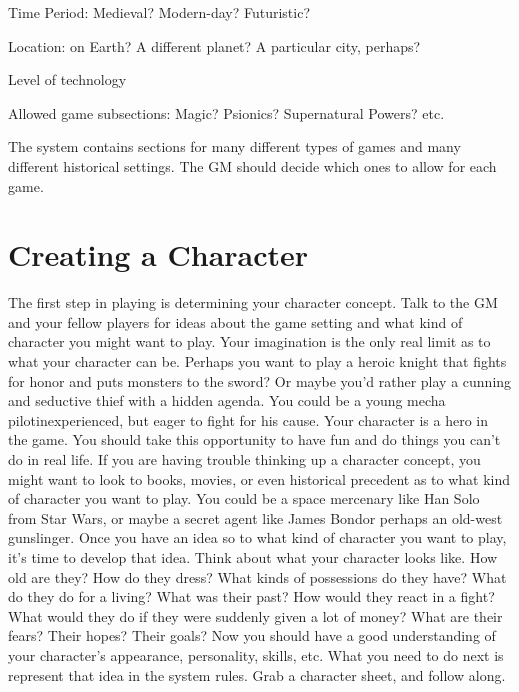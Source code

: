 \documentclass[twoside]{book}
\begin{document}
                 Time Period: Medieval? Modern-day? Futuristic?
                 
              
              
                  Location: on Earth? A different planet? A
                 particular city, perhaps? 
              
              
                Level of technology   
              
              
                  Allowed game subsections: Magic? Psionics?
                 Supernatural Powers? etc. 
              
           The \APATHY{}  system contains sections for many
            different types of games and many different historical
            settings. The GM should decide which ones to allow for each
            game.
          
\section{Creating a Character}
     The first step in playing \APATHY{}  is determining
            your character concept. Talk to the GM and your fellow
            players for ideas about the game setting and what kind of
            character you might want to play. Your imagination is the
            only real limit as to what your character can be. Perhaps you
            want to play a heroic knight that fights for honor and puts
            monsters to the sword? Or maybe you'd rather play a
            cunning and seductive thief with a hidden agenda. You could
            be a young mecha pilotinexperienced, but eager to
            fight for his cause. Your character is a hero in the game.
            You should take this opportunity to have fun and do things
            you can't do in real life.
           If you are having trouble thinking up a character
             concept, you might want to look to books, movies, or even
             historical precedent as to what kind of character you want
             to play. You could be a space mercenary like Han Solo from
             Star Wars, or maybe a secret agent like James Bondor
             perhaps an old-west gunslinger.  Once you have an idea so to what kind of character you
             want to play, it's time to develop that idea. Think
             about what your character looks like. How old are they? How
             do they dress? What kinds of possessions do they have? What
             do they do for a living? What was their past? How would they
             react in a fight? What would they do if they were suddenly
             given a lot of money? What are their fears? Their hopes?
             Their goals?  Now you should have a good understanding of your
            character's appearance, personality, skills, etc. What
            you need to do next is represent that idea in the \APATHY{} 
            system rules. Grab a character sheet, and follow along.
          
\end{document}
